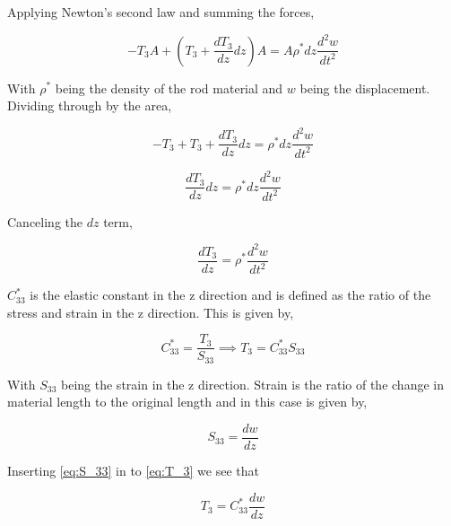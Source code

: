 Applying Newton's second law and summing the forces,

\begin{equation}
-T_3A + (T_3 + \frac{dT_3}{dz}dz)A = A\rho^* dz \frac{d^2w}{dt^2}
\end{equation}


With $\rho^*$ being the density of the rod material and $w$ being the displacement. Dividing through by the area,

\begin{equation}
-T_3 + T_3 + \frac{dT_3}{dz}dz = \rho^* dz \frac{d^2w}{dt^2}
\end{equation}

\begin{equation}
\frac{dT_3}{dz}dz = \rho^* dz \frac{d^2w}{dt^2}
\end{equation}

Canceling the $dz$ term,

\begin{equation}
\frac{dT_3}{dz} = \rho^* \frac{d^2w}{dt^2}
\label{eq:strainWave}
\end{equation}

$C^*_{33}$ is the elastic constant in the z direction and is defined as the ratio of the stress and strain in the z direction. This is given by,

\begin{equation}
C^*_{33} = \frac{T_3}{S_{33}} \implies T_3 = C^*_{33}S_{33}
\label{eq:T_3}
\end{equation}


With $S_{33}$ being the strain in the z direction. Strain is the ratio of the change in material length to the original length and in this case is given by,

\begin{equation}
S_{33} = \frac{dw}{dz}
\label{eq:S_33}
\end{equation}


Inserting \ref{eq:S_33} in to \ref{eq:T_3} we see that

\begin{equation}
T_3 = C^*_{33}\frac{dw}{dz}
\label{eq:T_3fin}
\end{equation}


